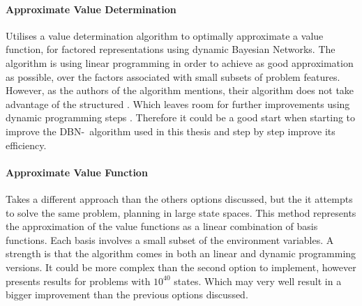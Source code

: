 \paragraph{Approximate Value Determination}
Utilises a value determination algorithm to optimally approximate a value function, for factored representations using dynamic Bayesian Networks. The algorithm is using linear programming in order to achieve as good approximation as possible, over the factors associated with small subsets of problem features. However, as the authors of the algorithm mentions, their algorithm does not take advantage of the structured . Which leaves room for further improvements using dynamic programming steps \parencite{koller1999computing}. Therefore it could be a good start when starting to improve the DBN-\etre\ algorithm used in this thesis and step by step improve its efficiency. 

\paragraph{Approximate Value Function}
Takes a different approach than the others options discussed, but the it attempts to solve the same problem, planning in large state spaces. This method represents the approximation of the value functions as a linear combination of basis functions. Each basis involves a small subset of the environment variables. A strength is that the algorithm comes in both an linear and dynamic programming versions. It could be more complex than the second option to implement, however \textcite{guestrin2003efficient} presents results for problems with $10^{40}$ states. Which may very well result in a bigger improvement than the previous options discussed.


